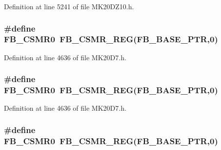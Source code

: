 Definition at line 5241 of file M\+K20\+D\+Z10.\+h.

\subsubsection[{\texorpdfstring{F\+B\+\_\+\+C\+S\+M\+R0}{FB_CSMR0}}]{\setlength{\rightskip}{0pt plus 5cm}\#define F\+B\+\_\+\+C\+S\+M\+R0~{\bf F\+B\+\_\+\+C\+S\+M\+R\+\_\+\+R\+EG}({\bf F\+B\+\_\+\+B\+A\+S\+E\+\_\+\+P\+TR},0)}\hypertarget{group___f_b___register___accessor___macros_gae35baa34099e965e4d9da6d74c723412}{}\label{group___f_b___register___accessor___macros_gae35baa34099e965e4d9da6d74c723412}


Definition at line 4636 of file M\+K20\+D7.\+h.

\subsubsection[{\texorpdfstring{F\+B\+\_\+\+C\+S\+M\+R0}{FB_CSMR0}}]{\setlength{\rightskip}{0pt plus 5cm}\#define F\+B\+\_\+\+C\+S\+M\+R0~{\bf F\+B\+\_\+\+C\+S\+M\+R\+\_\+\+R\+EG}({\bf F\+B\+\_\+\+B\+A\+S\+E\+\_\+\+P\+TR},0)}\hypertarget{group___f_b___register___accessor___macros_gae35baa34099e965e4d9da6d74c723412}{}\label{group___f_b___register___accessor___macros_gae35baa34099e965e4d9da6d74c723412}


Definition at line 4636 of file M\+K20\+D7.\+h.

\subsubsection[{\texorpdfstring{F\+B\+\_\+\+C\+S\+M\+R0}{FB_CSMR0}}]{\setlength{\rightskip}{0pt plus 5cm}\#define F\+B\+\_\+\+C\+S\+M\+R0~{\bf F\+B\+\_\+\+C\+S\+M\+R\+\_\+\+R\+EG}({\bf F\+B\+\_\+\+B\+A\+S\+E\+\_\+\+P\+TR},0)}\hypertarget{group___f_b___register___accessor___macros_gae35baa34099e965e4d9da6d74c723412}{}\label{group___f_b___register___accessor___macros_gae35baa34099e965e4d9da6d74c723412}


